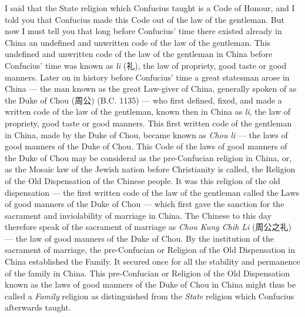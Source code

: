 I said that the State religion which Confucius taught is a Code of Honour, and I told you that Confucius made this Code out of the law of the gentleman.
But now I must tell you that long before Confucius' time there existed already in China an undefined and unwritten code of the law of the gentleman.
This undefined and unwritten code of the law of the gentleman in China before Confucius' time was known as \emph{li} (礼), the law of propriety, good taste or good manners.
Later on in history before Confucius' time a great statesman arose in China --- the man known as the great Law-giver of China, generally spoken of as the Duke of Chou (周公) (B.C. 1135)  --- who first defined, fixed, and made a written code of the law of the gentleman, known then in China as \emph{li}, the law of propriety, good taste or good manners.
This first written code of the gentleman in China, made by the Duke of Chou, became known as \emph{Chou li} --- the laws of good manners of the Duke of Chou.
This Code of the laws of good manners of the Duke of Chou may be consideral  as the pre-Confucian religion in China, or, as the Mosaic law of the Jewish  nation before Christianity is called, the Religion of the Old Dispensation of the Chinese people. 
It was this religion of the old dispensation --- the first written code of the law of the gentleman called the Laws of good manners of the Duke of Chou --- which first gave the sanction for the sacrament and inviolability of marriage in China.
The Chinese to this day therefore speak of the sacrament of marriage as {\em{Chou Kung Chih Li}} (周公之礼) --- the law of good manners of the Duke of Chou.
By the institution of the sacrament of marriage, the pre-Confucian or Religion of the Old Dispensation in China established the Family.
It secured once for all the stability and permanence of the family in China.
This pre-Confucian or Religion of the Old Dispensation known as the laws of good manners of the Duke of Chou in China might thus be called a \emph{Family} religion as distinguished from the \emph{State} religion which Confucius afterwards taught.

